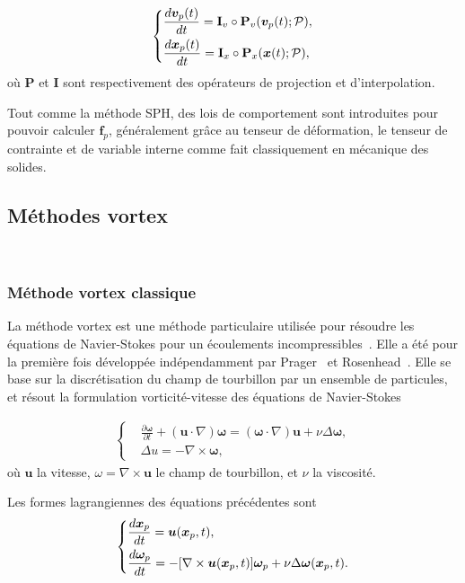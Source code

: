 \begin{gather}
    \left\{\begin{aligned}
         & \frac{d\bm v_p(t)}{dt} = \mathbf I_v \circ \mathbf P_v(\bm v_p(t);\mathcal P), \\
         & \frac{d \bm{x}_p(t)}{d t} = \mathbf I_x \circ \mathbf P_x(\bm{x}(t);\mathcal P),
    \end{aligned} \right.
\end{gather}où $\mathbf P$ et $\mathbf I$ sont respectivement des opérateurs de projection et d'interpolation.

Tout comme la méthode SPH, des lois de comportement sont introduites pour pouvoir calculer $\bm f_p$, généralement grâce au tenseur de déformation, le tenseur de contrainte et de variable interne comme fait classiquement en mécanique des solides.

\subsection{Méthodes vortex}~\label{sec:vortex}

\subsubsection{Méthode vortex classique}

La méthode vortex est une méthode particulaire utilisée pour résoudre les équations de Navier-Stokes pour un écoulements incompressibles~\cite{Cottet_Koumoutsakos_2000}. Elle a été pour la première fois développée indépendamment par Prager~\cite{prager1928druckverteilung} et Rosenhead~\cite{rosenhead1931formation}. Elle se base sur la discrétisation du champ de tourbillon par un ensemble de particules, et résout la formulation vorticité-vitesse des équations de Navier-Stokes


\begin{gather*}
    \left\{\begin{aligned}
         & \frac{\partial \bm \omega}{\partial t} + (\bm{u} \cdot \nabla) \bm \omega  =  (\bm \omega \cdot \nabla) \bm u + \nu \Delta \bm \omega, \\
         & \Delta u   =  -\nabla \times \bm \omega,
    \end{aligned} \right.
\end{gather*}où $\bm{u}$ la vitesse, $\omega= \nabla \times \bm u$ le champ de tourbillon, et $\nu$ la viscosité.

Les formes lagrangiennes des équations précédentes sont
\begin{gather*}
    \left\{\begin{aligned}
         & \frac{d \bm{x}_p}{dt} = \bm u(\bm{x}_p, t),                                                                        \\
         & \frac{d\bm \omega_p}{dt} = - [\nabla \times \bm u (\bm{x}_p, t)]\bm \omega_p + \nu \Delta \bm \omega(\bm{x}_p, t).
    \end{aligned} \right.
\end{gather*}

